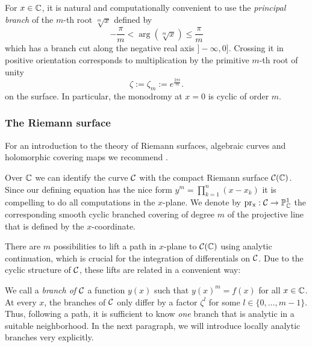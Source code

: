 \documentclass[main.tex]{subfiles}
\begin{document}
  For $x\in\mathbb{C}$, it is natural and computationally convenient to use the
  \emph{principal branch} of the $m$-th root $\sqrt[m]x$ defined by
  \begin{equation*}
      -\frac{π}m<\arg(\sqrt[m]x)\leq\frac{π}m
  \end{equation*}
  which has a branch cut along the negative real axis $]-\infty,0]$.
  Crossing it in positive orientation corresponds to multiplication by
  the primitive $m$-th root of unity
  \begin{equation*}
  \zeta := \zeta_m := e^{\frac{2\pi i }{m}}.
  \end{equation*}
  on the surface.
  In particular, the monodromy at $x=0$ is cyclic of order $m$.

  \subsubsection{The Riemann surface}\label{subsec:riemann_surface}

  For an introduction to the theory of Riemann surfaces, algebraic curves and holomorphic covering maps we recommend \cite{Miranda1995}.

   Over $\mathbb{C}$ we can identify the curve $\mathcal{C}$ with the compact Riemann surface $\mathcal{C}(\mathbb{C})$. Since our defining equation
   has the nice form
   $y^m = \prod_{k = 1}^n (x - x_k)$ it is compelling to do all computations in the $x$-plane.
   We denote by $\operatorname{pr_x} : \mathcal{C} \rightarrow \mathbb{P}^1_{\mathbb{C}}$ the corresponding smooth cyclic branched covering of degree $m$ 
   of the projective line that is
   defined by the $x$-coordinate.

  There
  are $m$ possibilities to lift a path in $x$-plane to $\mathcal{C}(\mathbb{C})$ using analytic continuation, which
  is crucial for the integration
  of differentials on $\mathcal{C}$. Due to the cyclic structure of $\mathcal{C}$, these lifts are related in a convenient way:

  We call a \emph{branch of $\mathcal{C}$} a function $y(x)$ such that
  $y(x)^m = f(x)$ for all $x \in \mathbb{C}$. At every $x$, the branches of $\mathcal{C}$ only
  differ by a factor $\zeta^l$ for some $l \in \{0,\dots,m-1\}$. Thus, following a path, it is sufficient to know \emph{one} branch that is analytic in a suitable neighborhood. In the
  next paragraph, we will introduce locally analytic branches very explicitly.
\end{document}
